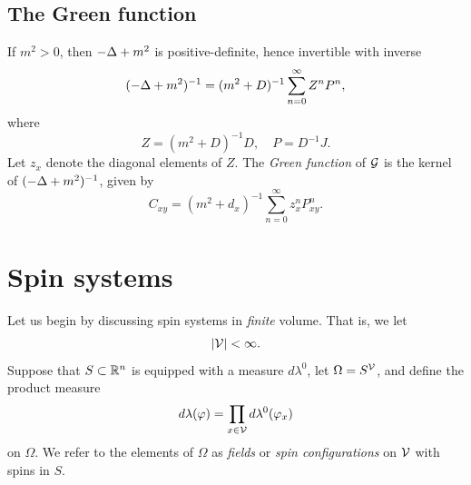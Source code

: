 
\subsection{The Green function}

If $m^2 > 0$, then $-\Delta + m^2$ is positive-definite, hence invertible with inverse
\begin{equation}
(-\Delta + m^2)^{-1} = (m^2 + D)^{-1} \sum_{n=0}^\infty Z^n P^n,
\end{equation}
where
\begin{equation}
Z = (m^2 + D)^{-1} D,
  \quad
P = D^{-1} J.
\end{equation}
Let $z_x$ denote the diagonal elements of $Z$. The \emph{Green function}
of $\mathcal{G}$ is the kernel of $(-\Delta + m^2)^{-1}$, given by
\begin{equation}
\label{e:greendef}
C_{xy}
  =
(m^2 + d_x)^{-1} \sum_{n=0}^\infty z_x^n P^n_{xy}.
\end{equation}


\section{Spin systems}
\label{sec:spins}

Let us begin by discussing spin systems in \emph{finite} volume. That is, we
let
\begin{equation}
|\mathcal{V}| < \infty.
\end{equation}
Suppose that $S \subset {\mathbb R}^n$ is equipped with a measure $d\lambda^0$, let
$\Omega = S^{\mathcal{V}}$, and define the product measure
\begin{equation}
d\lambda(\varphi) = \prod_{x\in\mathcal{V}} d\lambda^0(\varphi_x)
\end{equation}
on $\Omega$. We refer to the elements of $\Omega$ as \emph{fields}
or \emph{spin configurations} on $\mathcal{V}$ with spins in $S$.


